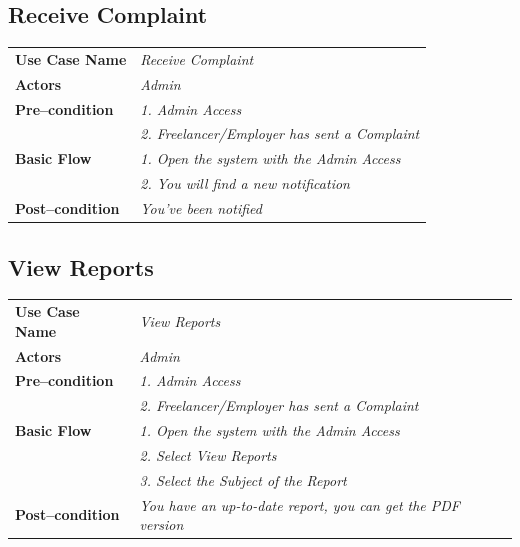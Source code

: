 \documentclass{article}
\begin{document}
\subsection{Receive Complaint}
    \begin{tabular}{ l | l }
    \toprule
      \rowcolor{LightCyan}
      \textbf{Use Case Name}    & \textit{Receive Complaint}\\
      \textbf{Actors}           & \textit{Admin}\\
      \rowcolor{LightCyan}
      \textbf{Pre--condition}   & \textit{1. Admin Access}\\
                                  \rowcolor{LightCyan}
                                & \textit{2. Freelancer/Employer has sent a Complaint}\\
      \textbf{Basic Flow}       & \textit{1. Open the system with the Admin Access}\\
                                & \textit{2. You will find a new notification}\\
      \rowcolor{LightCyan}
      \textbf{Post--condition}  & \textit{You've been notified}\\
    \toprule
    \end{tabular}




\subsection{View Reports}
    \begin{tabular}{ l | l }
    \toprule
      \rowcolor{LightCyan}
      \textbf{Use Case Name}    & \textit{View Reports}\\
      \textbf{Actors}           & \textit{Admin}\\
      \rowcolor{LightCyan}
      \textbf{Pre--condition}   & \textit{1. Admin Access}\\
                                  \rowcolor{LightCyan}
                                & \textit{2. Freelancer/Employer has sent a Complaint}\\
      \textbf{Basic Flow}       & \textit{1. Open the system with the Admin Access}\\
                                & \textit{2. Select View Reports}\\
                                & \textit{3. Select the Subject of the Report}\\
      \rowcolor{LightCyan}
      \textbf{Post--condition}  & \textit{You have an up-to-date report, you can get the PDF version}\\
    \toprule
    \end{tabular}
\end{document}
